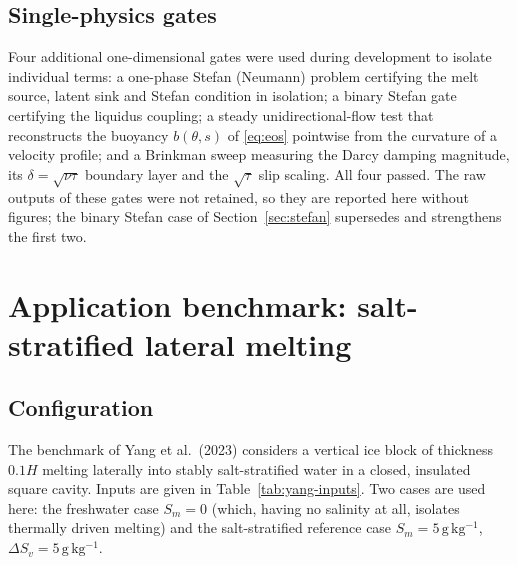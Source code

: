 \documentclass[review,12pt]{elsarticle}
\begin{document}
\subsection{Single-physics gates}

Four additional one-dimensional gates were used during development to isolate
individual terms: a one-phase Stefan (Neumann) problem certifying the melt
source, latent sink and Stefan condition in isolation; a binary Stefan gate
certifying the liquidus coupling; a steady unidirectional-flow test that
reconstructs the buoyancy $b(\theta,s)$ of \eqref{eq:eos} pointwise from the
curvature of a velocity profile; and a Brinkman sweep measuring the Darcy
damping magnitude, its $\delta=\sqrt{\nu\tau}$ boundary layer and the
$\sqrt{\tau}$ slip scaling. All four passed. The raw outputs of these gates were
not retained, so they are reported here without figures; the binary Stefan case
of Section~\ref{sec:stefan} supersedes and strengthens the first two.

\section{Application benchmark: salt-stratified lateral melting}
\label{sec:yang}

\subsection{Configuration}

The benchmark of Yang et al.\ (2023) considers a vertical ice block of thickness
$0.1H$ melting laterally into stably salt-stratified water in a closed,
insulated square cavity. Inputs are given in Table~\ref{tab:yang-inputs}. Two
cases are used here: the freshwater case $S_m=0$ (which, having no salinity at
all, isolates thermally driven melting) and the salt-stratified reference case
$S_m = 5\,\mathrm{g\,kg^{-1}}$, $\Delta S_v = 5\,\mathrm{g\,kg^{-1}}$.
\end{document}
